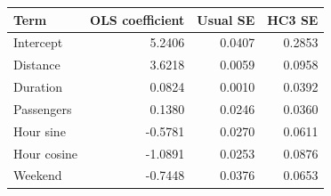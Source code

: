 \begin{tabular}{lrrr}
\toprule
Term & OLS coefficient & Usual SE & HC3 SE \\
\midrule
Intercept & 5.2406 & 0.0407 & 0.2853 \\
Distance & 3.6218 & 0.0059 & 0.0958 \\
Duration & 0.0824 & 0.0010 & 0.0392 \\
Passengers & 0.1380 & 0.0246 & 0.0360 \\
Hour sine & -0.5781 & 0.0270 & 0.0611 \\
Hour cosine & -1.0891 & 0.0253 & 0.0876 \\
Weekend & -0.7448 & 0.0376 & 0.0653 \\
\bottomrule
\end{tabular}
